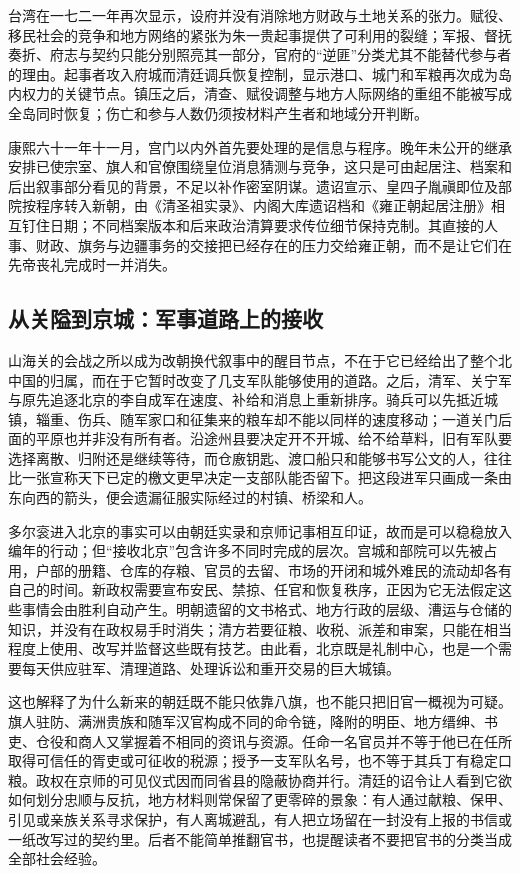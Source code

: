 台湾在一七二一年再次显示，设府并没有消除地方财政与土地关系的张力。赋役、移民社会的竞争和地方网络的紧张为朱一贵起事提供了可利用的裂缝；军报、督抚奏折、府志与契约只能分别照亮其一部分，官府的“逆匪”分类尤其不能替代参与者的理由。起事者攻入府城而清廷调兵恢复控制，显示港口、城门和军粮再次成为岛内权力的关键节点。镇压之后，清查、赋役调整与地方人际网络的重组不能被写成全岛同时恢复；伤亡和参与人数仍须按材料产生者和地域分开判断。

康熙六十一年十一月，宫门以内外首先要处理的是信息与程序。晚年未公开的继承安排已使宗室、旗人和官僚围绕皇位消息猜测与竞争，这只是可由起居注、档案和后出叙事部分看见的背景，不足以补作密室阴谋。遗诏宣示、皇四子胤禛即位及部院按程序转入新朝，由《清圣祖实录》、内阁大库遗诏档和《雍正朝起居注册》相互钉住日期；不同档案版本和后来政治清算要求传位细节保持克制。其直接的人事、财政、旗务与边疆事务的交接把已经存在的压力交给雍正朝，而不是让它们在先帝丧礼完成时一并消失。


\subsection*{从关隘到京城：军事道路上的接收}
山海关的会战之所以成为改朝换代叙事中的醒目节点，不在于它已经给出了整个北中国的归属，而在于它暂时改变了几支军队能够使用的道路。之后，清军、关宁军与原先追逐北京的李自成军在速度、补给和消息上重新排序。骑兵可以先抵近城镇，辎重、伤兵、随军家口和征集来的粮车却不能以同样的速度移动；一道关门后面的平原也并非没有所有者。沿途州县要决定开不开城、给不给草料，旧有军队要选择离散、归附还是继续等待，而仓廒钥匙、渡口船只和能够书写公文的人，往往比一张宣称天下已定的檄文更早决定一支部队能否留下。把这段进军只画成一条由东向西的箭头，便会遗漏征服实际经过的村镇、桥梁和人。

多尔衮进入北京的事实可以由朝廷实录和京师记事相互印证，故而是可以稳稳放入编年的行动；但“接收北京”包含许多不同时完成的层次。宫城和部院可以先被占用，户部的册籍、仓库的存粮、官员的去留、市场的开闭和城外难民的流动却各有自己的时间。新政权需要宣布安民、禁掠、任官和恢复秩序，正因为它无法假定这些事情会由胜利自动产生。明朝遗留的文书格式、地方行政的层级、漕运与仓储的知识，并没有在政权易手时消失；清方若要征粮、收税、派差和审案，只能在相当程度上使用、改写并监督这些既有技艺。由此看，北京既是礼制中心，也是一个需要每天供应驻军、清理道路、处理诉讼和重开交易的巨大城镇。

这也解释了为什么新来的朝廷既不能只依靠八旗，也不能只把旧官一概视为可疑。旗人驻防、满洲贵族和随军汉官构成不同的命令链，降附的明臣、地方缙绅、书吏、仓役和商人又掌握着不相同的资讯与资源。任命一名官员并不等于他已在任所取得可信任的胥吏或可征收的税源；授予一支军队名号，也不等于其兵丁有稳定口粮。政权在京师的可见仪式因而同省县的隐蔽协商并行。清廷的诏令让人看到它欲如何划分忠顺与反抗，地方材料则常保留了更零碎的景象：有人通过献粮、保甲、引见或亲族关系寻求保护，有人离城避乱，有人把立场留在一封没有上报的书信或一纸改写过的契约里。后者不能简单推翻官书，也提醒读者不要把官书的分类当成全部社会经验。

